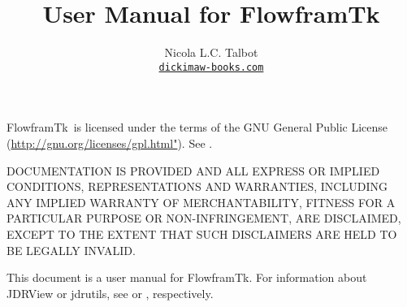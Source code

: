 
\usepackage{fontspec}
\setmainfont{Linux Libertine O}
\usepackage{verbatim}
\usepackage{longtable}
\usepackage{booktabs}
\usepackage
 [
    novref,
    fnsymleft,
 ]{texjavahelp}

\hypersetup{colorlinks,linkcolor=blue}

\newcommand{\FlowframTk}{FlowframTk}
\newcommand{\tool}[1]{\gls{menu.tools.#1} tool}
\newcommand{\texttool}{\tool{textarea}}
\newcommand{\mathstool}{\tool{math}}
\newcommand{\textmode}{\glslink{menu.tools.textarea}{text mode}}
\newcommand{\mathsmode}{\glslink{menu.tools.math}{\manmsg{maths} mode}}
\newcommand{\selectmode}{\glslink{menu.tools.select}{select mode}}
\newcommand{\select}{\hyperref[sec:selectobjects]{select}}
\newcommand{\selects}{\hyperref[sec:selectobjects]{selects}}
\newcommand{\selected}{\hyperref[sec:selectobjects]{selected}}
\newcommand{\selection}{\hyperref[sec:selectobjects]{selection}}
\newcommand{\gridlock}{\hyperref[mi:gridlock]{grid lock}}
\newcommand{\editpathmode}{\hyperref[sec:editpath]{edit path mode}}

\title{User Manual for \FlowframTk}
\author{Nicola L.C. Talbot\\\href{https://www.dickimaw-books.com/}{\nolinkurl{dickimaw-books.com}}}

\subtitle{\bigskip{}\bigskip}


\GlsXtrLoadResources[src={flowframtk,shared,\langbibsrcs},
 \TeXJavaHelpSymbolResourceOptions
]

\GlsXtrLoadResources[src={flowframtk,shared,\langbibsrcs},
 \TeXJavaHelpGlsResourceOptions
]


\maketitle

\FlowframTk\ is licensed under the terms of the GNU General Public License
(\url{http://gnu.org/licenses/gpl.html"}).
See .

DOCUMENTATION IS PROVIDED  AND ALL EXPRESS OR IMPLIED
CONDITIONS, REPRESENTATIONS AND WARRANTIES, INCLUDING ANY
IMPLIED WARRANTY OF MERCHANTABILITY, FITNESS FOR A PARTICULAR
PURPOSE OR NON-INFRINGEMENT, ARE DISCLAIMED, EXCEPT TO THE EXTENT THAT
SUCH DISCLAIMERS ARE HELD TO BE LEGALLY INVALID.

This document is a user manual for \FlowframTk. For information about
JDRView or jdrutils, see  or
, respectively.

